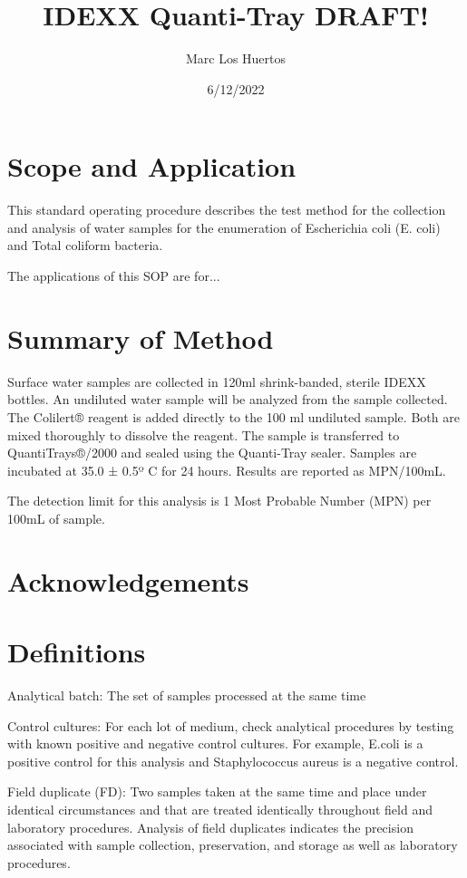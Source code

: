 \documentclass[12pt]{../SOP4_alpha}\usepackage[]{graphicx}\usepackage[]{xcolor}
\title{IDEXX Quanti-Tray DRAFT!}
\date{6/12/2022}
\author{Marc Los Huertos}
\begin{document}
\maketitle

\section{Scope and Application}

\NP This standard operating procedure describes the test method for the collection and analysis of water samples for the enumeration of Escherichia coli (E. coli) and
Total coliform bacteria.

\NP The applications of this SOP are for...

\section{Summary of Method}

\NP Surface water samples are collected in 120ml shrink-banded, sterile IDEXX bottles. An undiluted water sample will be analyzed from the sample collected.
The Colilert® reagent is added directly to the 100 ml undiluted sample. Both are mixed thoroughly to dissolve the reagent. The sample is transferred to QuantiTrays®/2000 and sealed using the Quanti-Tray sealer. Samples are incubated at 35.0 ± 0.5º C for 24 hours. Results are reported as MPN/100mL. 

\NP The detection limit for this analysis is 1 Most Probable Number (MPN) per 100mL of sample. 

\tableofcontents

\newpage

\section{Acknowledgements}

\section{Definitions}

\NP Analytical batch: The set of samples processed at the same time

\NP Control cultures: For each lot of medium, check analytical procedures by
testing with known positive and negative control cultures. For example,
E.coli is a positive control for this analysis and Staphylococcus aureus is a
negative control.

\NP Field duplicate (FD): Two samples taken at the same time and place under
identical circumstances and that are treated identically throughout field
and laboratory procedures. Analysis of field duplicates indicates the
precision associated with sample collection, preservation, and storage as
well as laboratory procedures.
\end{document}
